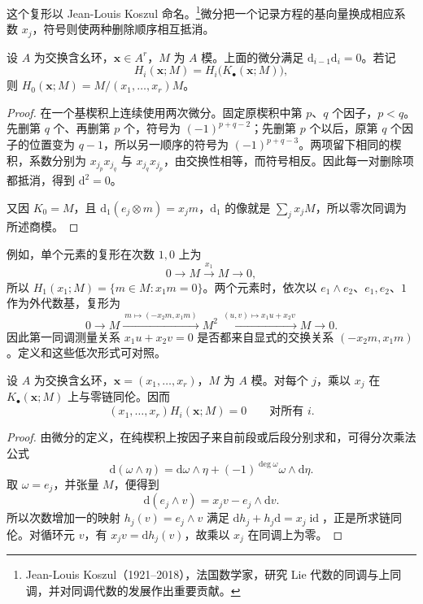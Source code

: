 这个复形以 Jean-Louis Koszul 命名。\footnote{Jean-Louis Koszul（1921--2018），法国数学家，研究 Lie 代数的同调与上同调，并对同调代数的发展作出重要贡献。}微分把一个记录方程的基向量换成相应系数 \(x_j\)，符号则使两种删除顺序相互抵消。

\begin{proposition}\label{g5:prop:koszul-differential-square}
	设 \(A\) 为交换含幺环，\(\mathbf x\in A^r\)，\(M\) 为 \(A\) 模。上面的微分满足 \(\mathrm d_{i-1}\mathrm d_i=0\)。若记
	\[
		H_i(\mathbf x;M)=H_i\bigl(K_\bullet(\mathbf x;M)\bigr),
	\]
	则 \(H_0(\mathbf x;M)=M/(x_1,\ldots,x_r)M\)。
\end{proposition}
\begin{proof}
	在一个基楔积上连续使用两次微分。固定原楔积中第 \(p\)、\(q\) 个因子，\(p<q\)。先删第 \(q\) 个、再删第 \(p\) 个，符号为 \((-1)^{p+q-2}\)；先删第 \(p\) 个以后，原第 \(q\) 个因子的位置变为 \(q-1\)，所以另一顺序的符号为 \((-1)^{p+q-3}\)。两项留下相同的楔积，系数分别为 \(x_{j_p}x_{j_q}\) 与 \(x_{j_q}x_{j_p}\)，由交换性相等，而符号相反。因此每一对删除项都抵消，得到 \(\mathrm d^2=0\)。

	又因 \(K_0=M\)，且 \(\mathrm d_1(e_j\otimes m)=x_jm\)，\(\mathrm d_1\) 的像就是 \(\sum_jx_jM\)，所以零次同调为所述商模。
\end{proof}

例如，单个元素的复形在次数 \(1,0\) 上为
\[
	0\longrightarrow M\xrightarrow{x_1}M\longrightarrow0,
\]
所以 \(H_1(x_1;M)=\{m\in M:x_1m=0\}\)。两个元素时，依次以 \(e_1\wedge e_2\)、\(e_1,e_2\)、\(1\) 作为外代数基，复形为
\[
	0\longrightarrow M
	\xrightarrow{\ m\mapsto(-x_2m,x_1m)\ }M^2
	\xrightarrow{\ (u,v)\mapsto x_1u+x_2v\ }M
	\longrightarrow0.
\]
因此第一同调测量关系 \(x_1u+x_2v=0\) 是否都来自显式的交换关系 \((-x_2m,x_1m)\)。定义和这些低次形式可对照\cite[第16节，第127—128页]{Matsumura1989}。

\begin{proposition}\label{g5:prop:koszul-null-homotopy}
	设 \(A\) 为交换含幺环，\(\mathbf x=(x_1,\ldots,x_r)\)，\(M\) 为 \(A\) 模。对每个 \(j\)，乘以 \(x_j\) 在 \(K_\bullet(\mathbf x;M)\) 上与零链同伦。因而
	\[
		(x_1,\ldots,x_r)H_i(\mathbf x;M)=0
		\qquad\text{对所有 }i.
	\]
\end{proposition}
\begin{proof}
	由微分的定义，在纯楔积上按因子来自前段或后段分别求和，可得分次乘法公式
	\[
		\mathrm d(\omega\wedge\eta)
		=\mathrm d\omega\wedge\eta
		+(-1)^{\deg\omega}\omega\wedge\mathrm d\eta.
	\]
	取 \(\omega=e_j\)，并张量 \(M\)，便得到
	\[
		\mathrm d(e_j\wedge v)=x_jv-e_j\wedge\mathrm d v.
	\]
	所以次数增加一的映射 \(h_j(v)=e_j\wedge v\) 满足
	\(\mathrm d h_j+h_j\mathrm d=x_j\operatorname{id}\)，正是所求链同伦。对循环元 \(v\)，有 \(x_jv=\mathrm d h_j(v)\)，故乘以 \(x_j\) 在同调上为零。
\end{proof}

